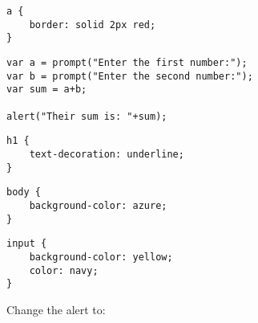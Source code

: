 \documentclass[]{memoir}
\begin{document}
\begin{lstlisting}
a {
    border: solid 2px red;
}
\end{lstlisting}


\begin{lstlisting}
var a = prompt("Enter the first number:");
var b = prompt("Enter the second number:");
var sum = a+b;

alert("Their sum is: "+sum);
\end{lstlisting}


\begin{lstlisting}
h1 {
    text-decoration: underline;
}
\end{lstlisting}


\begin{lstlisting}
body {
    background-color: azure;
}
\end{lstlisting}


\begin{lstlisting}
input {
    background-color: yellow;
    color: navy;
}
\end{lstlisting}


Change the alert to:
\end{document}
